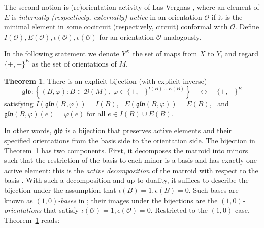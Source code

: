 \documentclass[12pt]{amsart}
\numberwithin{equation}{section}
\theoremstyle{definition}
\newtheorem{theorem}{Theorem}[section]
\newcommand{\Bcal}{{\mathcal B}}
\newcommand{\Ocal}{{\mathcal O}}
\newcommand{\GLV}{\mathfrak{glv}}
\newcommand{\Paco}[1]{\todo[size=\tiny,inline,color=orange!30]{#1 \\ \hfill --- P.}}
\newcommand{\Chiho}[1]{\todo[size=\tiny,inline,color=green!30]{#1 \\ \hfill --- Ch.}}
\begin{document}

The second notion is (re)orientation activity of Las Vergnas \cite{LV_Activity}, where an element of $E$ is {\em internally (respectively, externally) active} in an orientation $\Ocal$ if it is the minimal element in some cocircuit (respectively, circuit) conformal with $\Ocal$. Define $I(\Ocal),E(\Ocal),\iota(\Ocal),\epsilon(\Ocal)$ for an orientation $\Ocal$ analogously.

\medskip


In the following statement we denote  $Y^X$ the set of maps from $X$ to $Y$, and regard $\{+,-\}^E$ as the set of orientations of $M$.

\begin{theorem} \cite{GLV_AB2b} \label{thm:G_LV_bij}
There is an explicit bijection (with explicit inverse)  
\[
\GLV: \left\{(B,\varphi):B\in\Bcal(M),\ \varphi \in \{+,-\}^{I(B)\cup E(B)}\right\}\quad
\longleftrightarrow\quad \{+,-\}^E
\]
satisfying  $I(\GLV(B,\varphi))=I(B)$, \ $ E(\GLV(B,\varphi))=E(B)$, \ and \ $\GLV(B,\varphi)(e)=\varphi(e)$ for all $e\in I(B)\cup E(B)$. 

\end{theorem}

In other words, $\GLV$ is a bijection that preserves active elements and their specified orientations from the basis side to the orientation side.
%
The bijection in Theorem~\ref{thm:G_LV_bij} has two components. First, it decomposes the matroid into minors such that the restriction of the basis to each minor is a basis and has exactly one active element: this is the {\em active decomposition} of the matroid with respect to the basis \cite{GLV_AB2a}.
With such a decomposition and up to duality, it suffices to describe the bijection under the assumption that $\iota(B)=1,\epsilon(B)=0$. Such bases are known as {\em $(1,0)$-bases} in \cite{GLV_AB1}; their images under the bijections are the {\em $(1,0)$-orientations} that satisfy $\iota(\Ocal)=1,\epsilon(\Ocal)=0$. 
%
Restricted to the $(1,0)$ case, Theorem~\ref{thm:G_LV_bij} reads:
\end{document}
